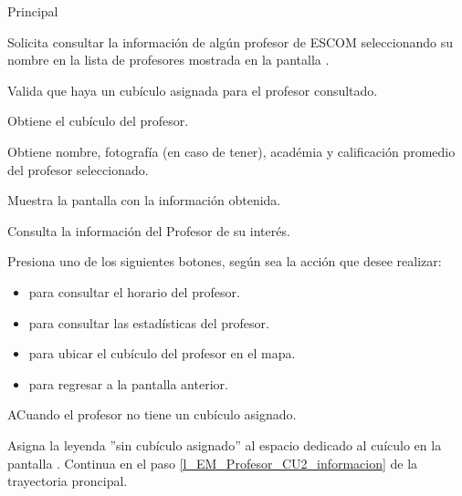 \begin{UCtrayectoria}{Principal}

	\UCpaso [\UCactor] Solicita consultar la información de algún profesor de ESCOM seleccionando su nombre en la lista de profesores mostrada en la pantalla .

	\UCpaso Valida que haya un cubículo asignada para el profesor consultado.  

	\UCpaso Obtiene el cubículo del profesor.

	\UCpaso Obtiene nombre, fotografía (en caso de tener), académia y calificación promedio del profesor seleccionado. \label{l_EM_Profesor_CU2_informacion}

	\UCpaso Muestra la pantalla  con la información obtenida.

	\UCpaso[\UCactor] Consulta la información del Profesor de su interés.

	\UCpaso [\UCactor] Presiona uno de los siguientes botones, según sea la acción que desee realizar: 
	\begin{itemize}
		\item {} para consultar el horario del profesor.
		\item {} para consultar las estadísticas del profesor.
		\item {} para ubicar el cubículo del profesor en el mapa.
		\item {} para regresar a la pantalla anterior.  
	\end{itemize}

\end{UCtrayectoria}

\begin{UCtrayectoriaA}{A}{Cuando el profesor no tiene un cubículo asignado.}

	\UCpaso	Asigna la leyenda ''sin cubículo asignado'' al espacio dedicado al cuículo en la pantalla .
	\UCpaso Continua en el paso \ref{l_EM_Profesor_CU2_informacion} de la trayectoria proncipal.

\end{UCtrayectoriaA}

